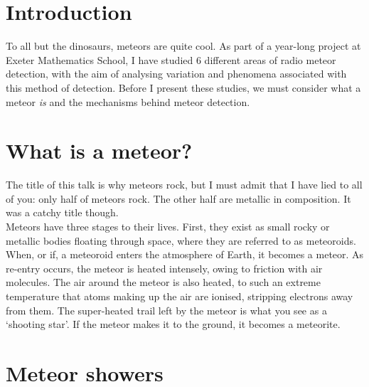 \documentclass[12pt]{article}
\begin{document}
\section{Introduction}

\large{
To all but the dinosaurs, meteors are quite cool. As part of a year-long
project at Exeter Mathematics School, I have studied 6 different areas of radio
meteor detection, with the aim of analysing variation and phenomena associated
with this method of detection. Before I present these studies, we must consider
what a meteor {\it is} and the mechanisms behind meteor detection.
}

\section{What is a meteor?}

\large{
The title of this talk is why meteors rock, but I must admit that I have lied
to all of you: only half of meteors rock. The other half are metallic in
composition. It was a catchy title though.\\

Meteors have three stages to their lives. First, they exist as small rocky or
metallic bodies floating through space, where they are referred to as
meteoroids. When, or if, a meteoroid enters the atmosphere of Earth, it becomes
a meteor. As re-entry occurs, the meteor is heated intensely, owing to friction
with air molecules. The air around the meteor is also heated, to such an
extreme temperature that atoms making up the air are ionised, stripping
electrons away from them. The super-heated trail left by the meteor is what you
see as a `shooting star'. If the meteor makes it to the ground, it becomes a
meteorite.
}

\section{Meteor showers}
\end{document}
